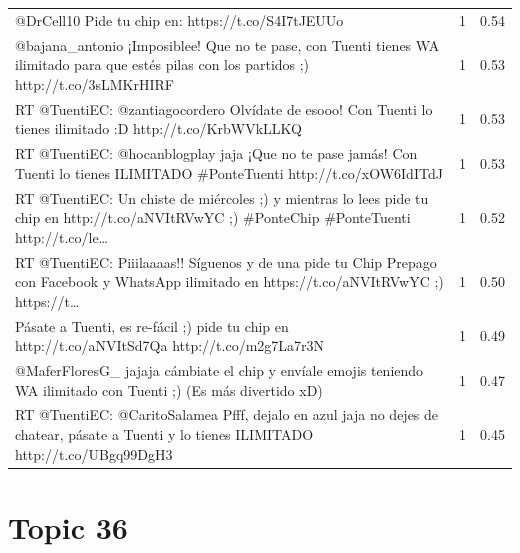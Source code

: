 \begin{longtable}{p{12.5cm}rr}
@DrCell10  Pide tu chip en: https://t.co/S4I7tJEUUo & 1 & 0.54 \\
@bajana\_antonio ¡Imposiblee! Que no te pase, con Tuenti tienes WA ilimitado para que estés pilas con los partidos ;) http://t.co/3sLMKrHIRF & 1 & 0.53 \\
RT @TuentiEC: @zantiagocordero Olvídate de esooo! Con Tuenti lo tienes ilimitado :D http://t.co/KrbWVkLLKQ & 1 & 0.53 \\
RT @TuentiEC: @hocanblogplay jaja ¡Que no te pase jamás! Con Tuenti lo tienes ILIMITADO \#PonteTuenti http://t.co/xOW6IdITdJ & 1 & 0.53 \\
RT @TuentiEC: Un chiste de miércoles ;) y mientras lo lees pide tu chip en http://t.co/aNVItRVwYC ;) \#PonteChip \#PonteTuenti http://t.co/le… & 1 & 0.52 \\
RT @TuentiEC: Piiilaaaas!! Síguenos y de una pide tu Chip Prepago con Facebook y WhatsApp ilimitado en https://t.co/aNVItRVwYC ;) https://t… & 1 & 0.50 \\
Pásate a Tuenti, es re-fácil ;) pide tu chip en http://t.co/aNVItSd7Qa http://t.co/m2g7La7r3N & 1 & 0.49 \\
@MaferFloresG\_ jajaja cámbiate el chip y envíale emojis teniendo WA ilimitado con Tuenti ;) (Es más divertido xD) & 1 & 0.47 \\
RT @TuentiEC: @CaritoSalamea Pfff, dejalo en azul jaja no dejes de chatear, pásate a Tuenti y lo tienes ILIMITADO http://t.co/UBgq99DgH3 & 1 & 0.45 \\

\end{longtable}
\clearpage

\section{Topic 36}

